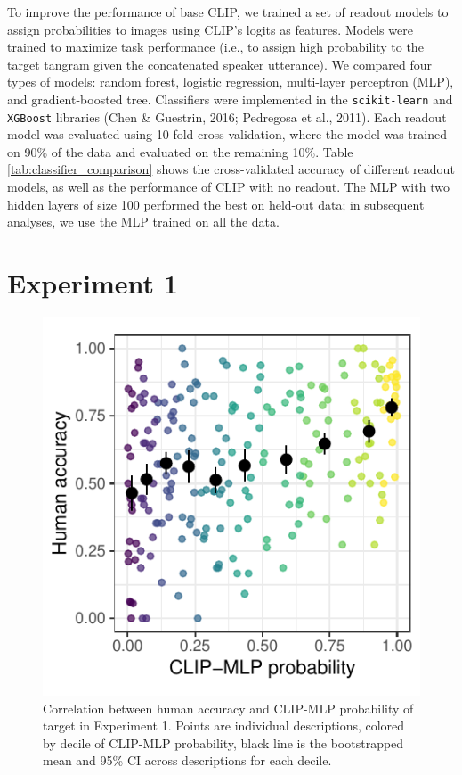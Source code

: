 \documentclass[10pt, letterpaper]{article}
\begin{document}
To improve the performance of base CLIP, we trained a set of readout
models to assign probabilities to images using CLIP's logits as
features. Models were trained to maximize task performance (i.e., to
assign high probability to the target tangram given the concatenated
speaker utterance). We compared four types of models: random forest,
logistic regression, multi-layer perceptron (MLP), and gradient-boosted
tree. Classifiers were implemented in the \texttt{scikit-learn} and
\texttt{XGBoost} libraries (Chen \& Guestrin, 2016; Pedregosa et al.,
2011). Each readout model was evaluated using 10-fold cross-validation,
where the model was trained on 90\% of the data and evaluated on the
remaining 10\%. Table \ref{tab:classifier_comparison} shows the
cross-validated accuracy of different readout models, as well as the
performance of CLIP with no readout. The MLP with two hidden layers of
size 100 performed the best on held-out data; in subsequent analyses, we
use the MLP trained on all the data.

\section{Experiment 1}\label{experiment-1}

\begin{CodeChunk}
\begin{figure}[t]

{\centering \includegraphics[width=0.7\linewidth]{figs/fig-calibration-1} 

}

\caption[Correlation between human accuracy and CLIP-MLP probability of target in Experiment 1]{Correlation between human accuracy and CLIP-MLP probability of target in Experiment 1.  Points are individual descriptions, colored by decile of CLIP-MLP probability, black line is the bootstrapped mean and 95\% CI across descriptions for each decile. \label{calibration}}\label{fig:fig-calibration}
\end{figure}
\end{CodeChunk}
\end{document}
